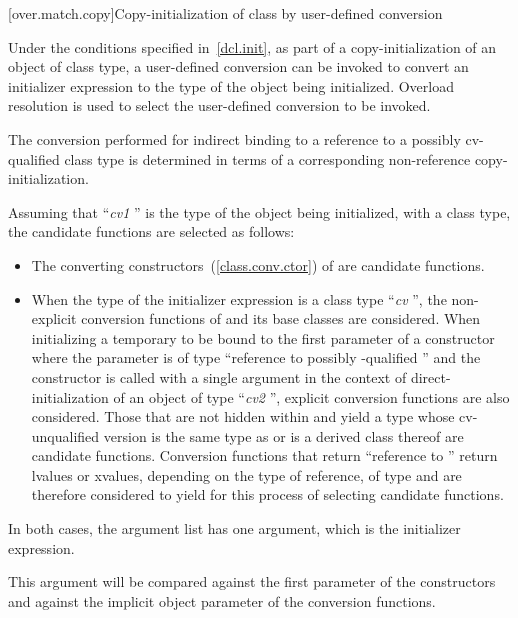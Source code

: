 [over.match.copy]{Copy-initialization of class by user-defined conversion}%

\pnum
Under the conditions specified in~\ref{dcl.init}, as
part of a copy-initialization of an object of class type, a user-defined
conversion can be invoked to convert an initializer expression to the
type of the object being initialized.
Overload resolution is used
to select the user-defined conversion to be invoked.
\begin{note} The conversion performed for indirect binding to a reference to a possibly
cv-qualified class type is determined in terms of a corresponding non-reference
copy-initialization. \end{note}
Assuming that
``\textit{cv1} '' is the type of the object being initialized, with
a class type,
the candidate functions are selected as follows:

\begin{itemize}
\item
The converting constructors~(\ref{class.conv.ctor}) of
are candidate functions.
\item
When the type of the initializer expression is a class type
``\textit{cv} '',
the non-explicit conversion functions of
and its base classes are considered.
When initializing a temporary to be bound to the first parameter of a
constructor
where the parameter is of type
``reference to possibly \cv-qualified ''
and the constructor is
called with a single argument in the context of
direct-initialization of an object of type ``\textit{cv2} '', explicit
conversion functions are also considered.
Those that are not hidden within
and yield a type whose cv-unqualified version is the same type as
or is a derived class thereof
are candidate functions.
Conversion functions that return ``reference to
''
return
lvalues or xvalues, depending on the type of reference, of type
and are therefore considered to yield
for this
process of selecting candidate functions.
\end{itemize}

\pnum
In both cases, the argument list has one argument, which is the initializer
expression.
\begin{note}
This argument will be compared against
the first parameter of the constructors and against the implicit
object parameter of the conversion functions.
\end{note}

